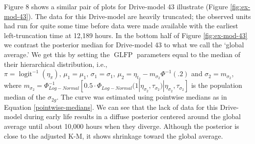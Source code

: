 \documentclass[12pt]{article}
\newcommand{\op}{\operatorname}
\begin{document}
Figure 8 shows a similar pair of plots for Drive-model 43 illustrate (Figure \ref{fig:ex-mod-43}). The data for this Drive-model are heavily truncated; the observed units had run for quite some time before data were made available with the earliest left-truncation time at 12,189 hours. In the bottom half of Figure \ref{fig:ex-mod-43} we contrast the posterior median for Drive-model 43 to what we call the `global average.' We get this by setting the $\op{GLFP}$ parameters equal to the median of their hierarchical distribution, i.e., $\pi=\op{logit}^{-1}(\eta_{\pi}),\, \mu_1=\mu_1,\, \sigma_1=\sigma_1,\, \mu_2=\eta_{t_2} - m_{\sigma_2}\Phi^{-1}(.2)$ and $\sigma_2= m_{\sigma_2}$, where $m_{\sigma_2}=\Phi_{Log-Normal}^{-1}[0.5 \cdot \Phi_{Log-Normal}(1|\eta_{\sigma_2},\tau_{\sigma_2})|\eta_{\sigma_2}, \tau_{\sigma_2}]$ is the population median of the $\sigma_{2g}$. The curve was estimated using pointwise medians as in Equation \ref{pointwise-medians}. We can see that the lack of data for this Drive-model during early life results in a diffuse posterior centered around the global average until about 10,000 hours when they diverge. Although the posterior is close to the adjusted K-M, it shows shrinkage toward the global average.
\end{document}
